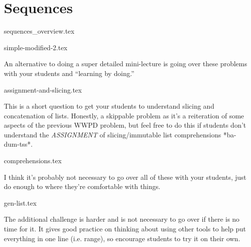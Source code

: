 \documentclass{exam}
\begin{document}
\section{Sequences}
{sequences_overview.tex}
\begin{questions}
    {simple-modified-2.tex}
    \begin{questionmeta}
        An alternative to doing a super detailed mini-lecture is going over these problems with your students and ``learning by doing.'' 
    \end{questionmeta}
    {assignment-and-slicing.tex}
    \begin{questionmeta}
        This is a short question to get your students to understand slicing and concatenation of lists. Honestly, a skippable problem as it's a reiteration of some aspects of the previous WWPD problem, but feel free to do this if students don't understand the \textit{ASSIGNMENT} of slicing/immutable list comprehensions *ba-dum-tss*.
    \end{questionmeta}
    {comprehensions.tex}
    \begin{questionmeta}
        I think it's probably not necessary to go over all of these with your students, just do enough to where they're comfortable with things. 
    \end{questionmeta}
    {gen-list.tex}
    \begin{questionmeta}
        The additional challenge is harder and is not necessary to go over if there is no time for it. It gives good practice on thinking about using other tools to help put everything in one line (i.e. range), so encourage students to try it on their own.
    \end{questionmeta}
\end{questions}
\end{document}
